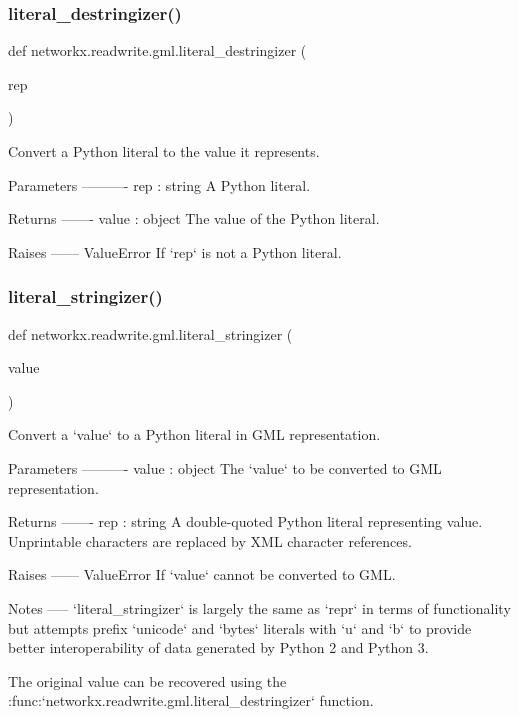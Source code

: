\subsubsection{\texorpdfstring{literal\+\_\+destringizer()}{literal\_destringizer()}}
{\footnotesize\ttfamily def networkx.\+readwrite.\+gml.\+literal\+\_\+destringizer (\begin{DoxyParamCaption}\item[{}]{rep }\end{DoxyParamCaption})}

\begin{DoxyVerb}Convert a Python literal to the value it represents.

Parameters
----------
rep : string
    A Python literal.

Returns
-------
value : object
    The value of the Python literal.

Raises
------
ValueError
    If `rep` is not a Python literal.
\end{DoxyVerb}
 \mbox{\label{namespacenetworkx_1_1readwrite_1_1gml_aea3dfde117c2087e1ddd2c8f37c0bb27}} 
\subsubsection{\texorpdfstring{literal\+\_\+stringizer()}{literal\_stringizer()}}
{\footnotesize\ttfamily def networkx.\+readwrite.\+gml.\+literal\+\_\+stringizer (\begin{DoxyParamCaption}\item[{}]{value }\end{DoxyParamCaption})}

\begin{DoxyVerb}Convert a `value` to a Python literal in GML representation.

Parameters
----------
value : object
    The `value` to be converted to GML representation.

Returns
-------
rep : string
    A double-quoted Python literal representing value. Unprintable
    characters are replaced by XML character references.

Raises
------
ValueError
    If `value` cannot be converted to GML.

Notes
-----
`literal_stringizer` is largely the same as `repr` in terms of
functionality but attempts prefix `unicode` and `bytes` literals with
`u` and `b` to provide better interoperability of data generated by
Python 2 and Python 3.

The original value can be recovered using the
:func:`networkx.readwrite.gml.literal_destringizer` function.
\end{DoxyVerb}
 \mbox{\label{namespacenetworkx_1_1readwrite_1_1gml_a322e0dbedf276e06fd8c60b8cbfb1494}} 
